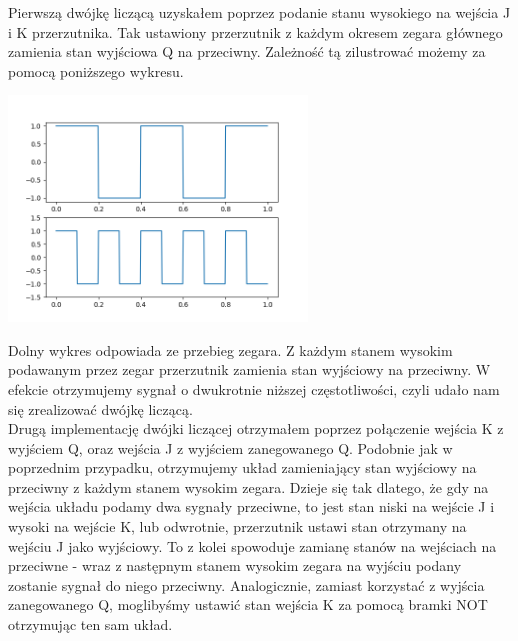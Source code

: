 \documentclass{article}
\begin{document}
            Pierwszą dwójkę liczącą uzyskałem poprzez podanie stanu wysokiego na wejścia J i K przerzutnika. Tak ustawiony przerzutnik z każdym okresem zegara głównego zamienia stan wyjściowa Q na przeciwny. Zależność tą zilustrować możemy za pomocą poniższego wykresu. 
            \begin{center}
                \includegraphics[height=6cm]{reports/plot/square_plot.png}\\
            \end{center}
            \FloatBarrier
            Dolny wykres odpowiada ze przebieg zegara. Z każdym stanem wysokim podawanym przez zegar przerzutnik zamienia stan wyjściowy na przeciwny. W efekcie otrzymujemy sygnał o dwukrotnie niższej częstotliwości, czyli udało nam się zrealizować dwójkę liczącą.\\
            Drugą implementację dwójki liczącej otrzymałem poprzez połączenie wejścia K z wyjściem Q, oraz wejścia J z wyjściem zanegowanego Q. Podobnie jak w poprzednim przypadku, otrzymujemy układ zamieniający stan wyjściowy na przeciwny z każdym stanem wysokim zegara. Dzieje się tak dlatego, że gdy na wejścia układu podamy dwa sygnały przeciwne, to jest stan niski na wejście J i wysoki na wejście K, lub odwrotnie, przerzutnik ustawi stan otrzymany na wejściu J jako wyjściowy. To z kolei spowoduje zamianę stanów na wejściach na przeciwne - wraz z następnym stanem wysokim zegara na wyjściu podany zostanie sygnał do niego przeciwny. Analogicznie, zamiast korzystać z wyjścia zanegowanego Q, moglibyśmy ustawić stan wejścia K za pomocą bramki NOT otrzymując ten sam układ. 
        
\end{document}
